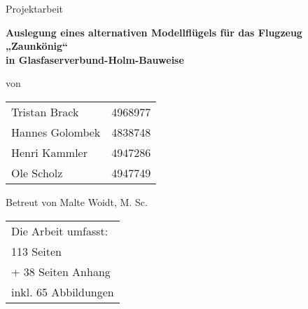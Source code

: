 
\begin{center}

	\par\bigskip
	\par\bigskip
	\par\bigskip
	\par\bigskip	
	\par\bigskip
	\par\bigskip	
	{Projektarbeit}\\
\begin{huge}	\par\bigskip
	\par\bigskip	
	\par\bigskip
	\par\bigskip	
	\textbf{Auslegung eines alternativen Modellflügels für das Flugzeug „Zaunkönig“} \\
	\textbf{in Glasfaserverbund-Holm-Bauweise}\\
	\par\bigskip
	\par\bigskip
	
	\end{huge}

	\par\bigskip
	
\par\bigskip
\par\bigskip	
	\par\bigskip
\par\bigskip
von	
\par\bigskip
\par\bigskip
\begin{tabular}{lr}
	Tristan Brack& 4968977\\
	Hannes Golombek & 4838748\\
	Henri Kammler & 4947286\\
	Ole Scholz & 4947749 \\
\end{tabular}
\par\bigskip
\par\bigskip	
\par\bigskip

Betreut von Malte Woidt, M. Sc.\\
\par\bigskip
\par\bigskip
\par\bigskip	
\par\bigskip
\par\bigskip	
\par\bigskip
\end{center}
\begin{tabular}{l}
	Die Arbeit umfasst:\\
	113 Seiten\\
	\:\:\:+ 38 Seiten Anhang\\
	inkl. 65 Abbildungen\\
\end{tabular}

